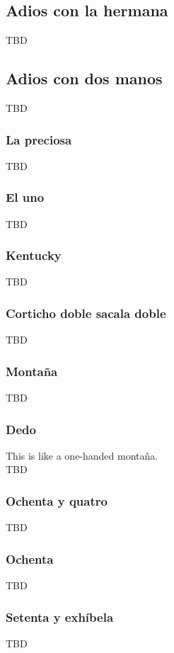 \subsection{Adios con la hermana}
TBD

\subsection{Adios con dos manos}
TBD

\subsubsection{La preciosa}
TBD

\subsubsection{El uno}
TBD

\subsubsection{Kentucky}
TBD

\subsubsection{Corticho doble sacala doble}
TBD

\subsubsection{Monta\~{n}a}
TBD

\subsubsection{Dedo}
This is like a one-handed monta\~{n}a.\\
TBD

\subsubsection{Ochenta y quatro}
TBD

\subsubsection{Ochenta}
TBD

\subsubsection{Setenta y exh\'{i}bela}
TBD

